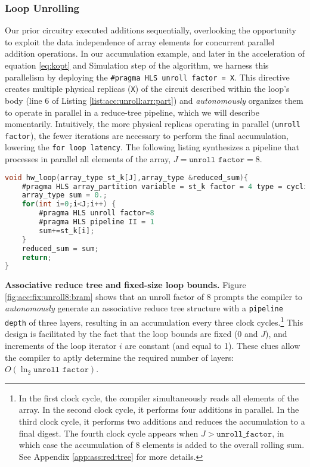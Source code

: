 \documentclass[12pt,american]{article}
\newcommand{\Naccsize}{J}
\begin{document}
\subsubsection{Loop Unrolling}\label{sec:acc:loopunroll}

Our prior circuitry executed additions sequentially, overlooking the opportunity to exploit the data independence of array elements for concurrent parallel addition operations. In our accumulation example, and later in the acceleration of equation \eqref{eq:kopt} and Simulation step of the \citet{KrusellSmith1998} algorithm, we harness this parallelism by deploying the \texttt{\#pragma HLS unroll factor = X}. This directive creates multiple physical replicas (\texttt{X}) of the circuit described within the loop's body (line 6 of Listing \ref{list:acc:unroll:arr:part}) and \textit{autonomously} organizes them to operate in parallel in a reduce-tree pipeline, which we will describe momentarily. Intuitively, the more physical replicas operating in parallel (\texttt{unroll factor}), the fewer iterations are necessary to perform the final accumulation, lowering the \texttt{for loop latency}. The following listing synthesizes a pipeline that processes in parallel all elements of the array, $\Naccsize=\texttt{unroll factor}=8$.

\begin{lstlisting}[language=C,caption= {Accumulator with Loop Unrolling of Factor 8},basicstyle=\footnotesize,label=list:acc:unroll:arr:part]
void hw_loop(array_type st_k[J],array_type &reduced_sum){
    #pragma HLS array_partition variable = st_k factor = 4 type = cyclic	
    array_type sum = 0.;
    for(int i=0;i<J;i++) {
        #pragma HLS unroll factor=8
        #pragma HLS pipeline II = 1
        sum+=st_k[i];
    }
    reduced_sum = sum;
    return;
}
\end{lstlisting}

\noindent \textbf{Associative reduce tree and fixed-size loop bounds.} Figure \ref{fig:acc:fix:unroll8:bram} shows that an unroll factor of 8 prompts the compiler to \textit{autonomously} generate an associative reduce tree structure with a \texttt{pipeline depth} of three layers, resulting in an accumulation every three clock cycles.\footnote{In the first clock cycle, the compiler simultaneously reads all elements of the array. In the second clock cycle, it performs four additions in parallel. In the third clock cycle, it performs two additions and reduces the accumulation to a final digest. The fourth clock cycle appears when $\Naccsize>\texttt{unroll\_factor}$, in which case the accumulation of 8 elements is added to the overall rolling sum. See Appendix \ref{app:ass:red:tree} for more details.} This design is facilitated by the fact that the loop bounds are fixed (0 and $\Naccsize$), and increments of the loop iterator $i$ are constant (and equal to 1). These clues allow the compiler to aptly determine the required number of layers: $O(\ln_{2} \texttt{unroll factor})$.
\end{document}
